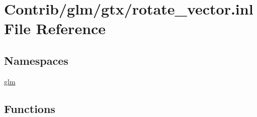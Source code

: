 \hypertarget{rotate__vector_8inl}{}\section{Contrib/glm/gtx/rotate\+\_\+vector.inl File Reference}
\label{rotate__vector_8inl}
\subsection*{Namespaces}
\begin{DoxyCompactItemize}
\item 
 \mbox{\hyperlink{namespaceglm}{glm}}
\end{DoxyCompactItemize}
\subsection*{Functions}
